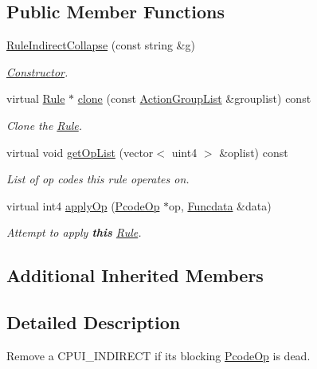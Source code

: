 \subsection*{Public Member Functions}
\begin{DoxyCompactItemize}
\item 
\mbox{\hyperlink{class_rule_indirect_collapse_a652d7b58ef0155951761c5de78545f58}{Rule\+Indirect\+Collapse}} (const string \&g)
\begin{DoxyCompactList}\small\item\em \mbox{\hyperlink{class_constructor}{Constructor}}. \end{DoxyCompactList}\item 
virtual \mbox{\hyperlink{class_rule}{Rule}} $\ast$ \mbox{\hyperlink{class_rule_indirect_collapse_aef29a6d2a3b44941b7c8b98eafef59aa}{clone}} (const \mbox{\hyperlink{class_action_group_list}{Action\+Group\+List}} \&grouplist) const
\begin{DoxyCompactList}\small\item\em Clone the \mbox{\hyperlink{class_rule}{Rule}}. \end{DoxyCompactList}\item 
virtual void \mbox{\hyperlink{class_rule_indirect_collapse_a8aec34ef85573539eb601cc19ab34860}{get\+Op\+List}} (vector$<$ uint4 $>$ \&oplist) const
\begin{DoxyCompactList}\small\item\em List of op codes this rule operates on. \end{DoxyCompactList}\item 
virtual int4 \mbox{\hyperlink{class_rule_indirect_collapse_a0d4041209c44deabc2baa829c022d642}{apply\+Op}} (\mbox{\hyperlink{class_pcode_op}{Pcode\+Op}} $\ast$op, \mbox{\hyperlink{class_funcdata}{Funcdata}} \&data)
\begin{DoxyCompactList}\small\item\em Attempt to apply {\bfseries{this}} \mbox{\hyperlink{class_rule}{Rule}}. \end{DoxyCompactList}\end{DoxyCompactItemize}
\subsection*{Additional Inherited Members}


\subsection{Detailed Description}
Remove a C\+P\+U\+I\+\_\+\+I\+N\+D\+I\+R\+E\+CT if its blocking \mbox{\hyperlink{class_pcode_op}{Pcode\+Op}} is dead. 

